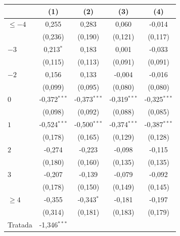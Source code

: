 \begingroup
\centering
\begin{tabular}{lcccc}
   \toprule
                          & (1)            & (2)            & (3)            & (4)\\  
   \midrule 
   $\leq -4$              & 0{,}255          & 0{,}283          & 0{,}060          & -0{,}014\\   
                          & (0{,}236)        & (0{,}190)        & (0{,}121)        & (0{,}117)\\   
   $-3$                   & 0{,}213$^{*}$    & 0{,}183          & 0{,}001          & -0{,}033\\   
                          & (0{,}115)        & (0{,}113)        & (0{,}091)        & (0{,}091)\\   
   $-2$                   & 0{,}156          & 0{,}133          & -0{,}004         & -0{,}016\\   
                          & (0{,}099)        & (0{,}095)        & (0{,}080)        & (0{,}080)\\   
   $0$                    & -0{,}372$^{***}$ & -0{,}373$^{***}$ & -0{,}319$^{***}$ & -0{,}325$^{***}$\\   
                          & (0{,}098)        & (0{,}092)        & (0{,}088)        & (0{,}085)\\   
   $1$                    & -0{,}524$^{***}$ & -0{,}500$^{***}$ & -0{,}374$^{***}$ & -0{,}387$^{***}$\\   
                          & (0{,}178)        & (0{,}165)        & (0{,}129)        & (0{,}128)\\   
   $2$                    & -0{,}274         & -0{,}223         & -0{,}098         & -0{,}115\\   
                          & (0{,}180)        & (0{,}160)        & (0{,}135)        & (0{,}135)\\   
   $3$                    & -0{,}207         & -0{,}139         & -0{,}079         & -0{,}092\\   
                          & (0{,}178)        & (0{,}150)        & (0{,}149)        & (0{,}145)\\   
   $\geq 4$               & -0{,}355         & -0{,}343$^{*}$   & -0{,}181         & -0{,}197\\   
                          & (0{,}314)        & (0{,}181)        & (0{,}183)        & (0{,}179)\\   
   Tratada                & -1{,}346$^{***}$ &                &                &   \\   

\end{tabular}
